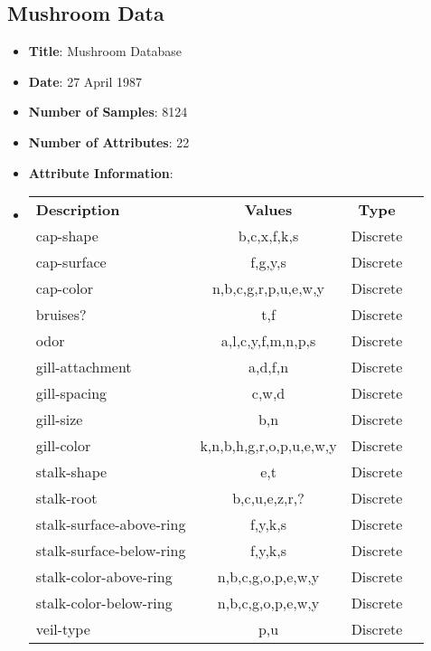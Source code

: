 \documentclass[11pt,titlepage]{article}
\newcommand{\bb}{\textbf}
\begin{document}
\subsection{Mushroom Data}
\begin{itemize}[leftmargin=*]
  \item[] \bb{Title}: Mushroom Database
  \item[] \bb{Date}: 27 April 1987
  \item[] \bb{Number of Samples}: 8124
  \item[] \bb{Number of Attributes}: 22
  \item[] \bb{Attribute Information}:
  \item[]
  \begin{tabular}{l c c c }
    \bb{Description}         & \bb{Values}             & \bb{Type} \\
    cap-shape                & b,c,x,f,k,s             & Discrete  \\
    cap-surface              & f,g,y,s                 & Discrete  \\
    cap-color                & n,b,c,g,r,p,u,e,w,y     & Discrete  \\
    bruises?                 & t,f                     & Discrete  \\
    odor                     & a,l,c,y,f,m,n,p,s       & Discrete  \\
    gill-attachment          & a,d,f,n                 & Discrete  \\
    gill-spacing             & c,w,d                   & Discrete  \\
    gill-size                & b,n                     & Discrete  \\
    gill-color               & k,n,b,h,g,r,o,p,u,e,w,y & Discrete  \\
    stalk-shape              & e,t                     & Discrete  \\
    stalk-root               & b,c,u,e,z,r,?           & Discrete  \\
    stalk-surface-above-ring & f,y,k,s                 & Discrete  \\
    stalk-surface-below-ring & f,y,k,s                 & Discrete  \\
    stalk-color-above-ring   & n,b,c,g,o,p,e,w,y       & Discrete  \\
    stalk-color-below-ring   & n,b,c,g,o,p,e,w,y       & Discrete  \\
    veil-type                & p,u                     & Discrete  \\

\end{tabular}
\end{itemize}
\end{document}
